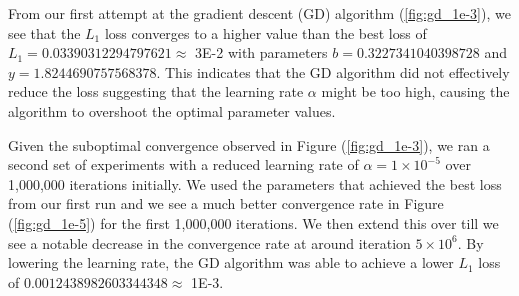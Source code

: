 \documentclass[a4paper]{report}
\begin{document}
From our first attempt at the gradient descent (GD) algorithm (\autoref{fig:gd_1e-3}), we see that the $L_1$ loss converges to a higher value than the best loss of $L_1 = 0.03390312294797621 \approx$ 3E-2 with parameters $b = 0.3227341040398728$ and $y = 1.8244690757568378$. This indicates that the GD algorithm did not effectively reduce the loss suggesting that the learning rate $\alpha$ might be too high, causing the algorithm  to overshoot the optimal parameter values.

Given the suboptimal convergence observed in Figure (\ref{fig:gd_1e-3}), we ran a second set of experiments with a reduced learning rate of $\alpha = 1 \times 10^{-5}$ over 1,000,000 iterations initially. We used the parameters that achieved the best loss from our first run and we see a much better convergence rate in Figure (\ref{fig:gd_1e-5}) for the first 1,000,000 iterations. We then extend this over till we see a notable decrease in the convergence rate at around iteration $5 \times 10^{6}$. By lowering the learning rate, the GD algorithm was able to achieve a lower $L_1$ loss of $0.0012438982603344348 \approx $ 1E-3.
\end{document}
